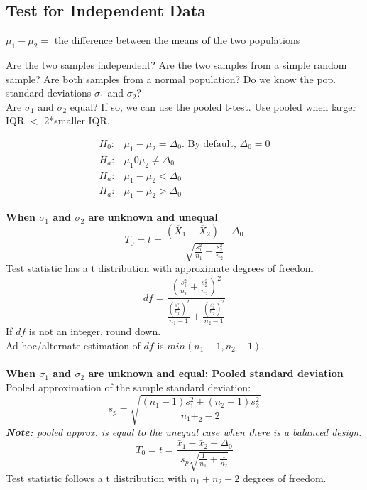 \documentclass[]{article}
\newenvironment{definitions}{
	\begin{description}[font=\sffamily\bfseries, leftmargin=1cm, style=nextline]
	}{
	\end{description}
}
\begin{document}
\subsection{Test for Independent Data}
\begin{definitions}
	\item[Parameter of interest]
	$\mu_1 - \mu_2 = $ the difference between the means of the two populations
	\item[Assumptions/requirements]
	Are the two samples independent? Are the two samples from a simple random sample? Are both samples from a normal population? Do we know the pop. standard deviations $\sigma_1$ and $\sigma_2$?\\
	Are $\sigma_1$ and $\sigma_2$ equal? If so, we can use the pooled t-test. Use pooled when larger IQR $<$ 2*smaller IQR.
	\item[Hypotheses]
	\begin{align*}
		H_0:& \mu_1 - \mu_2 = \Delta_0. \text{ By default, } \Delta_0 = 0\\
		H_a:& \mu_1 0 \mu_2 \neq \Delta_0\\
		H_a:& \mu_1 - \mu_2 < \Delta_0\\
		H_a:& \mu_1 - \mu_2 > \Delta_0
	\end{align*} 
	\item[Test statistic]
	\textbf{When $\sigma_1$ and $\sigma_2$ are unknown and unequal}
	\[ T_0 = t = \frac{(\overline{X}_1 - \overline{X}_2) - \Delta_0}{\sqrt{\frac{s_1^2}{n_1} + \frac{s_2^2}{n_2}}} \]
	Test statistic has a t distribution with approximate degrees of freedom
	\[ df = \frac{\left(\frac{s_1^2}{n_1} + \frac{s_2^2}{n_2}\right)^2}{\frac{\left(\frac{s_1^2}{n_1}\right)^2}{n_1-1} + \frac{\left(\frac{s_2^2}{n_2}\right)^2}{n_2-1}} \]
	If $df$ is not an integer, round down.\\
	Ad hoc/alternate estimation of $df$ is $min(n_1-1,n_2-1)$.\\\\
	\textbf{When $\sigma_1$ and $\sigma_2$ are unknown and equal; Pooled standard deviation}\\
	Pooled approximation of the sample standard deviation:
	\[ s_p = \sqrt{\frac{(n_1-1)s_1^2 + (n_2-1)s_2^2}{n_1+_2-2}} \]
	\emph{\textbf{Note:} pooled approx. is equal to the unequal case when there is a balanced design.}\\
	\[ T_0 = t = \frac{\bar{x}_1 - \bar{x}_2 - \Delta_0}{s_p\sqrt{\frac{1}{n_1} + \frac{1}{n_2}}}\]
	Test statistic follows a t distribution with $n_1+n_2-2$ degrees of freedom.
	\item[Rejection criteria -- critical value]

\end{definitions}
\end{document}
